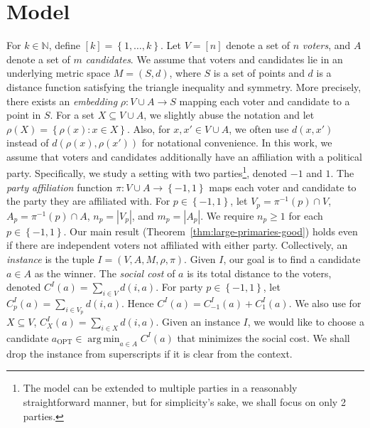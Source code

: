 \documentclass[letterpaper]{article} %
\theoremstyle{definition}
\newcommand{\set}[1]{\left\{#1\right\}}
\DeclareMathOperator*{\argmin}{\arg\,\min}
\newcommand{\bbN}{\mathbb{N}}
\newcommand{\pleft}{-1}
\newcommand{\pright}{1}
\newcommand{\opt}{{\textrm{OPT}}}
\begin{document}
\section{Model}
\label{sec:model}
For $k \in \bbN$, define $[k] = \set{1,\ldots,k}$. Let $V = [n]$ denote a set of $n$ \emph{voters}, and $A$ denote a set of $m$ \emph{candidates}. We assume that voters and candidates lie in an underlying metric space $M = (S,d)$, where $S$ is a set of points and $d$ is a distance function satisfying the triangle inequality and symmetry. More precisely, there exists an \emph{embedding} $\rho : V \cup A \to S$ mapping each voter and candidate to a point in $S$. For a set $X \subseteq V \cup A$, we slightly abuse the notation and let $\rho(X) = \set{\rho(x) : x \in X}$. Also, for $x,x' \in V \cup A$, we often use $d(x,x')$ instead of $d(\rho(x),\rho(x'))$ for notational convenience.
In this work, we assume that voters and candidates additionally have an affiliation with a political party. Specifically, we study a setting with two parties\footnote{The model can be extended to multiple parties in a reasonably straightforward manner, but for simplicity's sake, we shall focus on only 2 parties.}, denoted $\pleft$ and $\pright$. The \emph{party affiliation} function $\pi : V \cup A \to \set{\pleft,\pright}$ maps each voter and candidate to the party they are affiliated with. For $p \in \set{\pleft,\pright}$, let $V_p = \pi^{-1}(p) \cap V$, $A_p = \pi^{-1}(p) \cap A$, $n_p = |V_p|$, and $m_p = |A_p|$. We require $n_p \ge 1$ for each $p \in \set{\pleft,\pright}$. Our main result (Theorem~\ref{thm:large-primaries-good}) holds even if there are independent voters not affiliated with either party. %
Collectively, an \emph{instance} is the tuple $I = (V,A,M,\rho,\pi)$. Given $I$, our goal is to find a candidate $a \in A$ as the winner. The \emph{social cost} of $a$ is its total distance to the voters, denoted $C^I(a) = \sum_{i \in V} d(i,a)$. For party $p \in \set{\pleft,\pright}$, let $C^I_p(a) = \sum_{i \in V_p} d(i,a)$. Hence $C^I(a) = C^I_{\pleft}(a) + C^I_{\pright}(a)$. We also use for $X \subseteq V$, $C^I_X(a) = \sum_{i \in X} d(i,a)$. Given an instance $I$, we would like to choose a candidate $a_{\opt} \in \argmin_{a \in A} C^I(a)$ that minimizes the social cost. We shall drop the instance from superscripts if it is clear from the context.
\end{document}
